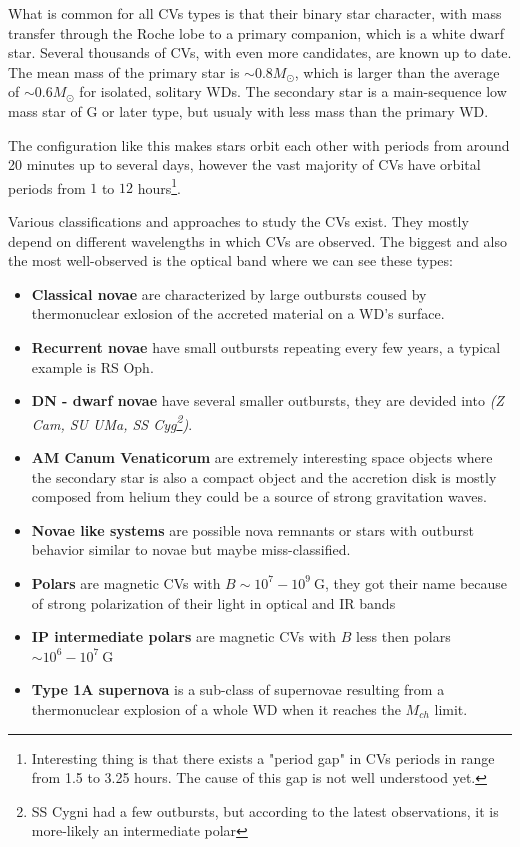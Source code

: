 \documentclass[oneside,a4paper,11pt]{report}
\begin{document}
What is common for all CVs types is that their binary star character, with mass transfer through the Roche lobe to a primary 
companion, which is a white dwarf star. Several thousands of CVs, with even more candidates, are known up to date. 
The mean mass of the primary star is $\sim 0.8 M_\odot$, which is larger than the average of $\sim 0.6 M_\odot$ for isolated, 
solitary WDs.
The secondary star is a main-sequence low mass star of G or later type, but usualy with less mass than the primary WD.      

The configuration like this makes stars orbit each other with periods from around 20 minutes up to several days, 
however the vast majority of CVs have orbital periods from $1$ to $12$ hours\footnote{Interesting thing is that there exists a "period gap" 
in CVs periods in range from 1.5 to 3.25 hours. The cause of this gap is not well understood yet. }.

Various classifications and approaches to study the CVs exist. They mostly depend on different wavelengths in which CVs are 
observed. The biggest and also the most well-observed is the optical band where we can see these types: 
\begin{itemize}
 \item \textbf{Classical novae} are characterized by large outbursts coused by thermonuclear exlosion of the accreted material on a WD's surface.
 \item \textbf{Recurrent novae} have small outbursts repeating every few years, a typical example is RS Oph.
 \item \textbf{DN - dwarf novae} have several smaller outbursts, they are devided into \textit{(Z Cam, SU UMa, SS Cyg\footnote{SS Cygni had a few 
outbursts, but according to the latest observations, it is more-likely an intermediate polar})}. 
 \item \textbf{AM Canum Venaticorum} are extremely interesting space objects where the secondary star is also a compact object and the accretion 
disk is mostly composed from helium they could be a source of strong gravitation waves. 
 \item \textbf{Novae like systems} are possible nova remnants or stars with outburst behavior similar to novae but maybe miss-classified.
 \item \textbf{Polars} are magnetic CVs with $B \sim 10^7 - 10^9 \:\mathrm{G}$, they got their name because of strong polarization of their light in optical and IR bands 
 \item \textbf{IP intermediate polars} are magnetic CVs with $B$ less then polars $\sim10^6-10^7\: \mathrm{G}$ 
 \item \textbf{Type 1A supernova} is a sub-class of supernovae resulting from a thermonuclear explosion of a whole WD when it reaches the $M_{ch}$ limit.  
\end{itemize}
\end{document}
